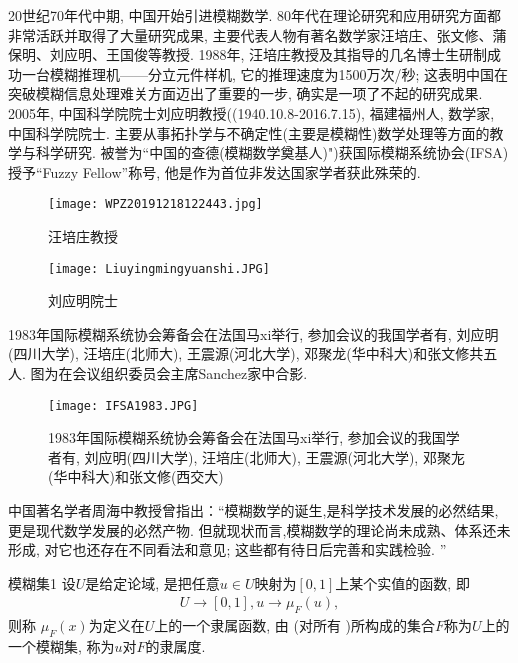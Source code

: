 20世纪70年代中期, 中国开始引进模糊数学.
80年代在理论研究和应用研究方面都非常活跃并取得了大量研究成果, 主要代表人物有著名数学家汪培庄、张文修、蒲保明、刘应明、王国俊等教授.
1988年, 汪培庄教授及其指导的几名博士生研制成功一台模糊推理机——分立元件样机, 它的推理速度为1500万次/秒; 这表明中国在突破模糊信息处理难关方面迈出了重要的一步, 确实是一项了不起的研究成果.
2005年, 中国科学院院士刘应明教授((1940.10.8-2016.7.15), 福建福州人, 数学家, 中国科学院院士.
主要从事拓扑学与不确定性(主要是模糊性)数学处理等方面的教学与科学研究. 被誉为“中国的查德(模糊数学奠基人)")获国际模糊系统协会(IFSA)授予“Fuzzy Fellow”称号, 他是作为首位非发达国家学者获此殊荣的.
\begin{figure}[H]
    \centering
    \texttt{[image: WPZ20191218122443.jpg]}
    \caption{汪培庄教授}
    \label{WPZ20191218122443}
\end{figure}
\begin{figure}[H]
    \centering
    \texttt{[image: Liuyingmingyuanshi.JPG]}
    \caption{刘应明院士}
    \label{WPZ20191218122443}
\end{figure}
1983年国际模糊系统协会筹备会在法国马xi举行, 参加会议的我国学者有, 刘应明(四川大学), 汪培庄(北师大), 王震源(河北大学), 邓聚龙(华中科大)和张文修共五人. 图为在会议组织委员会主席Sanchez家中合影.
\begin{figure}[H]
    \centering
    \texttt{[image: IFSA1983.JPG]}
    \caption{1983年国际模糊系统协会筹备会在法国马xi举行, 参加会议的我国学者有, 刘应明(四川大学), 汪培庄(北师大), 王震源(河北大学), 邓聚㔫(华中科大)和张文修(西交大)}
    \label{WPZ20191218122443}
\end{figure}
中国著名学者周海中教授曾指出：“模糊数学的诞生,是科学技术发展的必然结果, 更是现代数学发展的必然产物. 但就现状而言,模糊数学的理论尚未成熟、体系还未形成, 对它也还存在不同看法和意见; 这些都有待日后完善和实践检验. ”
\begin{mydef}{模糊集}{1}
设$U$是给定论域,   是把任意$u\in U$映射为$[0, 1]$上某个实值的函数, 即
\begin{align}
    U\rightarrow [0, 1], u\rightarrow \mu_F(u),
\end{align}
则称 $ \mu_F(x)$为定义在$U$上的一个隶属函数, 由   (对所有    )所构成的集合$F$称为$U$上的一个模糊集, 称为$u$对$F$的隶属度.
\end{mydef}


